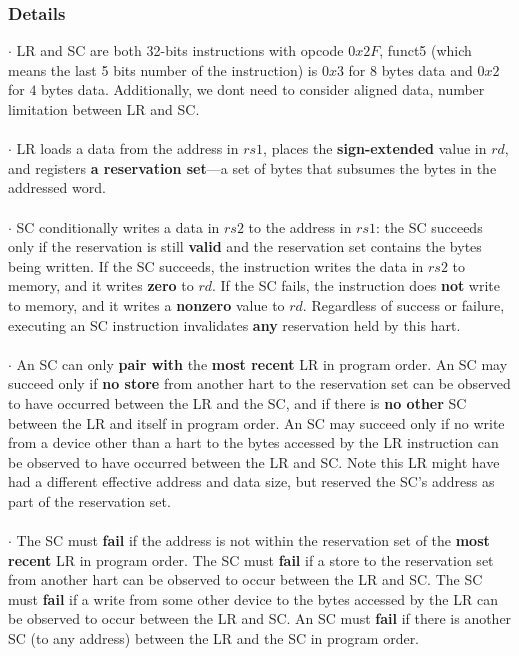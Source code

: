 \documentclass{article}
\begin{document}
\subsubsection{Details}
$\cdot$     LR and SC are both 32-bits instructions with opcode $0x2F$, funct5 (which means the last 5 bits number of the instruction) is $0x3$ for $8$ bytes data and $0x2$ for $4$ bytes data. Additionally, we dont need to consider aligned data, number limitation between LR and SC.\\\\
$\cdot$     LR loads a data from the address in $rs1$, places the \textbf{sign-extended} value in $rd$, and registers \textbf{a reservation set}—a set of bytes that subsumes the bytes in the addressed word. \\\\
$\cdot$     SC conditionally writes a data in $rs2$ to the address in $rs1$: the SC succeeds only if the reservation is still \textbf{valid} and the reservation set contains the
bytes being written. If the SC succeeds, the instruction writes the data in $rs2$ to memory, and it writes \textbf{zero} to $rd$. If the SC fails, the instruction does \textbf{not} write to memory, and it writes a \textbf{nonzero} value to $rd$. Regardless of success or failure, executing an SC instruction invalidates \textbf{any} reservation held by this hart. \\\\
$\cdot$     An SC can only \textbf{pair with} the \textbf{most recent} LR in program order. An SC may succeed only if \textbf{no store} from another hart to the reservation set can be observed to have occurred between the LR and the SC, and if there is \textbf{no other} SC between the LR and itself in program order. An SC may succeed only if no write from a device other than a hart to the bytes accessed by the LR instruction can be observed to have occurred between the LR and SC. Note this LR might have had a different effective address and data size, but reserved the SC's address as part of the reservation set.\\\\
$\cdot$     The SC must \textbf{fail} if the address is not within the reservation set of the \textbf{most recent} LR in program order. The SC must \textbf{fail} if a store to the reservation set from another hart can be observed to occur between the LR and SC. The SC must \textbf{fail} if a write from some other device to the bytes accessed by the LR can be observed to occur between the LR and SC. An SC must \textbf{fail} if there is another SC (to any address) between the LR and the SC in program order.\\\\
\end{document}
